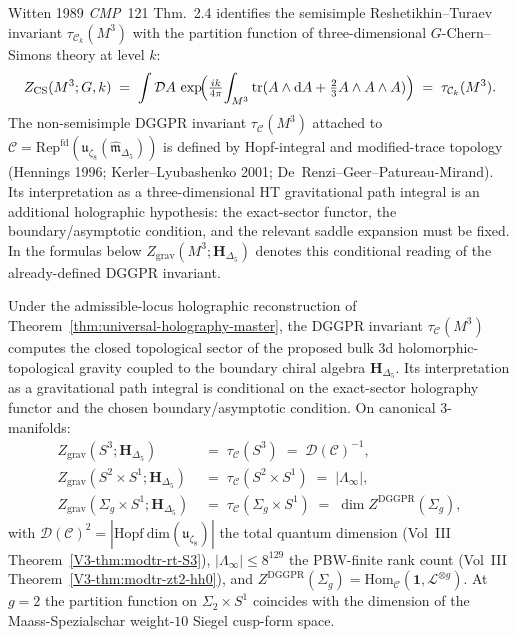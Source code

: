 Witten 1989 \emph{CMP}~121 Thm.~2.4 identifies the semisimple
Reshetikhin--Turaev invariant $\tau_{\mathcal C_k}(M^3)$ with the
partition function of three-dimensional $G$-Chern--Simons theory
at level $k$:
\[
 Z_{\mathrm{CS}}(M^3; G, k)
 \;=\;
 \int \mathcal DA\,
 \exp\!\Bigl(\tfrac{ik}{4\pi}\!\int_{M^3}\mathrm{tr}
 (A\wedge\mathrm dA + \tfrac23 A\wedge A\wedge A)\Bigr)
 \;=\;
 \tau_{\mathcal C_k}(M^3).
\]
The non-semisimple DGGPR invariant $\tau_{\mathcal C}(M^3)$ attached
to $\mathcal C = \mathrm{Rep}^{\mathrm{fd}}(\mathfrak u_{\zeta_8}
(\widehat{\mathfrak m}_{\Delta_5}))$ is defined by Hopf-integral and
modified-trace topology (Hennings 1996; Kerler--Lyubashenko 2001;
De~Renzi--Geer--Patureau-Mirand). Its interpretation as a
three-dimensional HT gravitational path integral is an additional
holographic hypothesis: the exact-sector functor, the boundary/asymptotic
condition, and the relevant saddle expansion must be fixed. In the
formulas below
$Z_{\mathrm{grav}}(M^3;\mathbf H_{\Delta_5})$ denotes this conditional
reading of the already-defined DGGPR invariant.

\begin{theorem}
\label{thm:thqghr-rt-canonical-manifolds}
Under the admissible-locus holographic reconstruction of
Theorem~\ref{thm:universal-holography-master},
the DGGPR invariant $\tau_{\mathcal C}(M^3)$ computes the closed
topological sector of the proposed bulk 3d holomorphic-topological
gravity coupled to the boundary chiral algebra $\mathbf H_{\Delta_5}$.
Its interpretation as a gravitational path integral is conditional on
the exact-sector holography functor and the chosen boundary/asymptotic
condition. On canonical 3-manifolds:
\begin{align}
 Z_{\mathrm{grav}}(S^3; \mathbf H_{\Delta_5})
 &\;=\;\tau_{\mathcal C}(S^3)
 \;=\;\mathcal D(\mathcal C)^{-1},
 \label{eq:thqghr-Z-S3}\\
 Z_{\mathrm{grav}}(S^2\!\times\! S^1; \mathbf H_{\Delta_5})
 &\;=\;\tau_{\mathcal C}(S^2\!\times\! S^1)
 \;=\;|\Lambda_\infty|,
 \label{eq:thqghr-Z-S2S1}\\
 Z_{\mathrm{grav}}(\Sigma_g\!\times\! S^1; \mathbf H_{\Delta_5})
 &\;=\;\tau_{\mathcal C}(\Sigma_g\!\times\! S^1)
 \;=\;\dim Z^{\mathrm{DGGPR}}(\Sigma_g),
 \label{eq:thqghr-Z-SigmagS1}
\end{align}
with $\mathcal D(\mathcal C)^2 = |\mathrm{Hopf\ dim}(\mathfrak u_{\zeta_8})|$
the total quantum dimension (Vol~III
Theorem~\ref{V3-thm:modtr-rt-S3}), $|\Lambda_\infty|\leq 8^{129}$ the
PBW-finite rank count (Vol~III Theorem~\ref{V3-thm:modtr-zt2-hh0}),
and $Z^{\mathrm{DGGPR}}(\Sigma_g) = \mathrm{Hom}_{\mathcal C}
(\mathbf 1, \mathcal L^{\otimes g})$. At $g = 2$ the partition function
on $\Sigma_2\times S^1$ coincides with the dimension of the
Maass-Spezialschar weight-$10$ Siegel cusp-form space.
\end{theorem}


